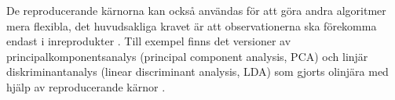 \documentclass[a4paper, 12pt]{report}
\theoremstyle{definition}
\theoremstyle{remark}
\begin{document}
De reproducerande kärnorna kan också användas för att göra andra algoritmer mera flexibla, det huvudsakliga kravet är att observationerna ska förekomma endast i inreprodukter \cite{ESL, LearningKernels}. Till exempel finns det versioner av principalkomponentsanalys (principal component analysis, PCA) och linjär diskriminantanalys (linear discriminant analysis, LDA) som gjorts olinjära med hjälp av reproducerande kärnor \cite{ESL}.



\end{document}

